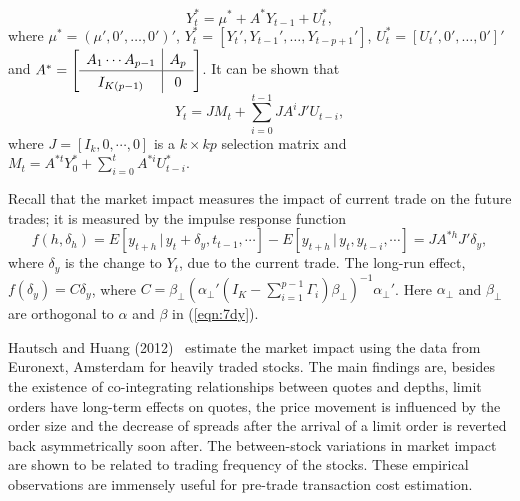 	\begin{equation}\label{eqn:starlargeyt}
	Y_t^*= \mu^* + A^* Y_{t-1} + U_t^*,
	\end{equation}
where $\mu^*=(\mu',0',\ldots,0')'$, $Y_t^*=[Y_t',Y_{t-1}',\ldots,Y_{t-p+1}']$, $U_t^*=[U_t',0',\ldots,0']'$ and $A^*=\renewcommand\arraystretch{1.3} \mleft[ \begin{array}{c|c} A_1\cdots A_{p-1} & A_p \\ \hline I_{K(p-1)} & 0 \end{array} \mright]$. It can be shown that 
	\begin{equation}\label{eqn:7anotherlargeyt}
	Y_t= JM_t + \sum_{i=0}^{t-1} JA^i J' U_{t-i},
	\end{equation}
where $J=[I_k,0,\cdots,0]$ is a $k\times kp$ selection matrix and $M_t= A^{*t} Y_0^* + \sum_{i=0}^t A^{*i}U_{t-i}^*$.


Recall that the market impact measures the impact of current trade on the future trades; it is measured by the impulse response function
	\begin{equation}\label{eqn:impulserep}
	f(h,\delta_h) = E[y_{t+h}\,|\, y_t+\delta_y,t_{t-1},\cdots] - E[y_{t+h} \,|\, y_t,y_{t-i},\cdots] = JA^{*h} J' \delta_y,
	\end{equation}
where $\delta_y$ is the change to $Y_t$, due to the current trade. The long-run effect, $f(\delta_y)=C \delta_y$, where $C=\beta_\perp(\alpha_\perp'(I_K - \sum_{i=1}^{p-1} \Gamma_i ) \beta_\perp )^{-1} \alpha_\perp'$. Here $\alpha_\perp$ and $\beta_\perp$ are orthogonal to $\alpha$ and $\beta$ in (\ref{eqn:7dy}).


Hautsch and Huang (2012)~\cite{hauthuang} estimate the market impact using the data from Euronext, Amsterdam for heavily traded stocks. The main findings are, besides the existence of co-integrating relationships between quotes and depths, limit orders have long-term effects on quotes, the price movement is influenced by the order size and the decrease of spreads after the arrival of a limit order is reverted back asymmetrically soon after. The between-stock variations in market impact are shown to be related to trading frequency of the stocks. These empirical observations are immensely useful for pre-trade transaction cost estimation.


